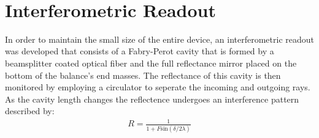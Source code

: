 \documentclass [12pt, proquest]{uwthesis}[2019]
\begin{document}
\begin{figure}%
\begin{center}
\\
\caption{}
\label{cBRS}
\end{center}
\end{figure}

\section{Interferometric Readout}
In order to maintain the small size of the entire device, an interferometric readout was developed that consists of a Fabry-Perot cavity that is formed by a beamsplitter coated optical fiber and the full reflectance mirror placed on the bottom of the balance's end masses. The reflectance of this cavity is then monitored by employing a circulator to seperate the incoming and outgoing rays. As the cavity length changes the reflectence undergoes an interference pattern described by:
\begin{align}
R=\frac{1}{1+F \text{sin}(\delta/2 \lambda)}
\end{align}
\end{document}
